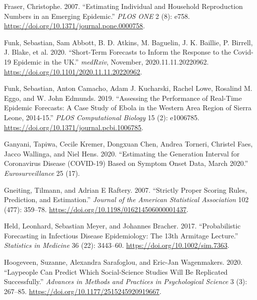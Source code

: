 \documentclass[
]{article}
\newlength{\cslhangindent}
\newlength{\cslentryspacingunit} %
\newenvironment{CSLReferences}[2] %
 {%
  \setlength{\parindent}{0pt}
  \ifodd #1
  \let\oldpar\par
  \def\par{\hangindent=\cslhangindent\oldpar}
  \fi
  \setlength{\parskip}{#2\cslentryspacingunit}
 }%
 {}
\begin{document}
\begin{CSLReferences}{1}{0}
\leavevmode{}%
Fraser, Christophe. 2007. {``Estimating {Individual} and {Household Reproduction Numbers} in an {Emerging Epidemic}.''} \emph{PLOS ONE} 2 (8): e758. \url{https://doi.org/10.1371/journal.pone.0000758}.

\leavevmode{}%
Funk, Sebastian, Sam Abbott, B. D. Atkins, M. Baguelin, J. K. Baillie, P. Birrell, J. Blake, et al. 2020. {``Short-Term Forecasts to Inform the Response to the {Covid}-19 Epidemic in the {UK}.''} \emph{medRxiv}, November, 2020.11.11.20220962. \url{https://doi.org/10.1101/2020.11.11.20220962}.

\leavevmode{}%
Funk, Sebastian, Anton Camacho, Adam J. Kucharski, Rachel Lowe, Rosalind M. Eggo, and W. John Edmunds. 2019. {``Assessing the Performance of Real-Time Epidemic Forecasts: A Case Study of {Ebola} in the {Western Area} Region of {Sierra Leone}, 2014-15.''} \emph{PLOS Computational Biology} 15 (2): e1006785. \url{https://doi.org/10.1371/journal.pcbi.1006785}.

\leavevmode{}%
Ganyani, Tapiwa, Cecile Kremer, Dongxuan Chen, Andrea Torneri, Christel Faes, Jacco Wallinga, and Niel Hens. 2020. {``Estimating the Generation Interval for Coronavirus Disease (COVID-19) Based on Symptom Onset Data, March 2020.''} \emph{Eurosurveillance} 25 (17).

\leavevmode{}%
Gneiting, Tilmann, and Adrian E Raftery. 2007. {``Strictly Proper Scoring Rules, Prediction, and Estimation.''} \emph{Journal of the American Statistical Association} 102 (477): 359--78. \url{https://doi.org/10.1198/016214506000001437}.

\leavevmode{}%
Held, Leonhard, Sebastian Meyer, and Johannes Bracher. 2017. {``Probabilistic Forecasting in Infectious Disease Epidemiology: The 13th {Armitage} Lecture.''} \emph{Statistics in Medicine} 36 (22): 3443--60. \url{https://doi.org/10.1002/sim.7363}.

\leavevmode{}%
Hoogeveen, Suzanne, Alexandra Sarafoglou, and Eric-Jan Wagenmakers. 2020. {``Laypeople {Can Predict Which Social}-{Science Studies Will Be Replicated Successfully}.''} \emph{Advances in Methods and Practices in Psychological Science} 3 (3): 267--85. \url{https://doi.org/10.1177/2515245920919667}.


\end{CSLReferences}
\end{document}
